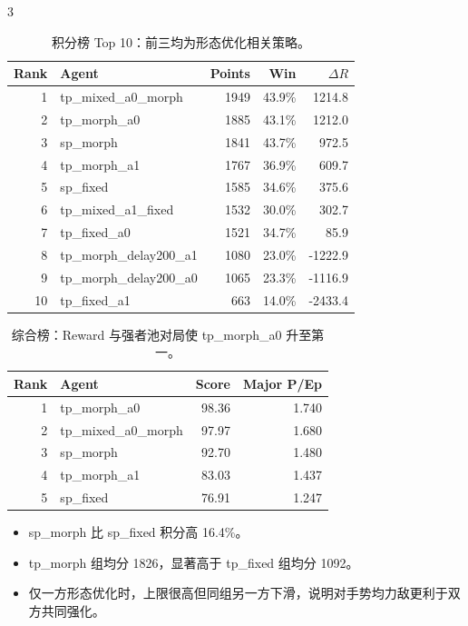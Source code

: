 \documentclass[final]{beamer}
\newcommand{\agent}[1]{{\ttfamily\scriptsize #1}}
\begin{document}
\begin{frame}[t]
\begin{multicols}{3}
\begin{table}
\centering
\scriptsize
\caption{积分榜 Top 10：前三均为形态优化相关策略。}
\begin{tabular}{@{}r l r r r@{}}
\toprule
Rank & Agent & Points & Win & $\Delta R$\\
\midrule
1 & \agent{tp\_mixed\_a0\_morph} & 1949 & 43.9\% & 1214.8\\
2 & \agent{tp\_morph\_a0} & 1885 & 43.1\% & 1212.0\\
3 & \agent{sp\_morph} & 1841 & 43.7\% & 972.5\\
4 & \agent{tp\_morph\_a1} & 1767 & 36.9\% & 609.7\\
5 & \agent{sp\_fixed} & 1585 & 34.6\% & 375.6\\
6 & \agent{tp\_mixed\_a1\_fixed} & 1532 & 30.0\% & 302.7\\
7 & \agent{tp\_fixed\_a0} & 1521 & 34.7\% & 85.9\\
8 & \agent{tp\_morph\_delay200\_a1} & 1080 & 23.0\% & -1222.9\\
9 & \agent{tp\_morph\_delay200\_a0} & 1065 & 23.3\% & -1116.9\\
10 & \agent{tp\_fixed\_a1} & 663 & 14.0\% & -2433.4\\
\bottomrule
\end{tabular}
\end{table}

\begin{table}
\centering
\scriptsize
\caption{综合榜：Reward 与强者池对局使 \agent{tp\_morph\_a0} 升至第一。}
\begin{tabular}{@{}r l r r@{}}
\toprule
Rank & Agent & Score & Major P/Ep\\
\midrule
1 & \agent{tp\_morph\_a0} & 98.36 & 1.740\\
2 & \agent{tp\_mixed\_a0\_morph} & 97.97 & 1.680\\
3 & \agent{sp\_morph} & 92.70 & 1.480\\
4 & \agent{tp\_morph\_a1} & 83.03 & 1.437\\
5 & \agent{sp\_fixed} & 76.91 & 1.247\\
\bottomrule
\end{tabular}
\end{table}

\begin{itemize}
  \item \agent{sp\_morph} 比 \agent{sp\_fixed} 积分高 16.4\%。
  \item \agent{tp\_morph} 组均分 1826，显著高于 \agent{tp\_fixed} 组均分 1092。
  \item 仅一方形态优化时，上限很高但同组另一方下滑，说明对手势均力敌更利于双方共同强化。
\end{itemize}


\end{multicols}
\end{frame}
\end{document}
